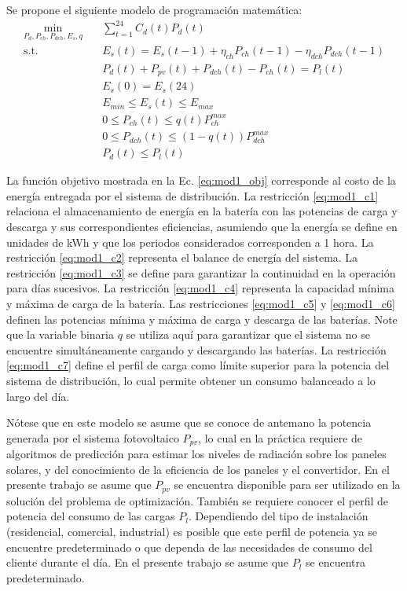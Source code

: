 Se propone el siguiente modelo de programación matemática:
\begin{subequations}
\begin{align}
	\min_{P_d,P_{ch},P_{dch},E_s,q} \quad & \sum_{t=1}^{24} C_d(t) P_d(t)\label{eq:mod1_obj}\\
	\textrm{s.t.} \quad & E_s(t) = E_s(t-1) + \eta_{ch} P_{ch}(t-1) - \eta_{dch} P_{dch}(t-1)\label{eq:mod1_c1}\\
	& P_d(t) + P_{pv}(t) + P_{dch}(t) - P_{ch}(t) = P_l(t)\label{eq:mod1_c2}\\
	& E_s(0) = E_s(24)\label{eq:mod1_c3}\\
	& E_{min} \leq E_s(t) \leq E_{max}\label{eq:mod1_c4}\\
	& 0 \leq P_{ch}(t) \leq q(t) P_{ch}^{max}\label{eq:mod1_c5}\\
	& 0 \leq P_{dch}(t) \leq (1-q(t)) P_{dch}^{max}\label{eq:mod1_c6}\\
	& P_d(t) \leq P_l(t)\label{eq:mod1_c7}
\end{align}\label{eq:mod1}
\end{subequations}

La función objetivo mostrada en la Ec. \eqref{eq:mod1_obj} corresponde al costo de la energía entregada por el sistema de distribución. La restricción \eqref{eq:mod1_c1} relaciona el almacenamiento de energía en la batería con las potencias de carga y descarga y sus correspondientes eficiencias, asumiendo que la energía se define en unidades de kWh y que los periodos considerados corresponden a 1 hora. La restricción \eqref{eq:mod1_c2} representa el balance de energía del sistema. La restricción \eqref{eq:mod1_c3} se define para garantizar la continuidad en la operación para días sucesivos. La restricción \eqref{eq:mod1_c4} representa la capacidad mínima y máxima de carga de la batería. Las restricciones \eqref{eq:mod1_c5} y \eqref{eq:mod1_c6} definen las potencias mínima y máxima de carga y descarga de las baterías. Note que la variable binaria $q$ se utiliza aquí para garantizar que el sistema no se encuentre simultáneamente cargando y descargando las baterías. La restricción \eqref{eq:mod1_c7} define el perfil de carga como límite superior para la potencia del sistema de distribución, lo cual permite obtener un consumo balanceado a lo largo del día.

Nótese que en este modelo se asume que se conoce de antemano la potencia generada por el sistema fotovoltaico $P_{pv}$, lo cual en la práctica requiere de algoritmos de predicción para estimar los niveles de radiación sobre los paneles solares, y del conocimiento de la eficiencia de los paneles y el convertidor. En el presente trabajo se asume que $P_{pv}$ se encuentra disponible para ser utilizado en la solución del problema de optimización. También se requiere conocer el perfil de potencia del consumo de las cargas $P_l$. Dependiendo del tipo de instalación (residencial, comercial, industrial) es posible que este perfil de potencia ya se encuentre predeterminado o que dependa de las necesidades de consumo del cliente durante el día. En el presente trabajo se asume que $P_l$ se encuentra predeterminado.

